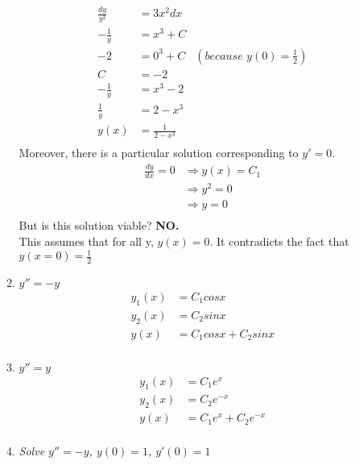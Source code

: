 \documentclass{article}
\begin{document}
\begin{enumerate}
\begin{enumerate}
                    \begin{align*}
                        \frac{dy}{y^2}&=3x^2dx \\
                        -\frac{1}{y}&=x^3+C \\
                        -2&=0^3+C &(\textit{because }y(0)=\frac{1}{2}) \\
                        C&=-2 \\
                        -\frac{1}{y}&=x^3-2 \\
                        \frac{1}{y}&=2-x^3 \\
                        y(x)&=\frac{1}{2-x^3} \\
                    \end{align*}
                    Moreover, there is a particular solution corresponding to $y'=0$.
                        \begin{align*}
                            \frac{dy}{dx}=0&\Rightarrow y(x)=C_1 \\
                            &\Rightarrow y^2=0 \\
                            &\Rightarrow y=0 \\
                        \end{align*}
                    But is this solution viable? \textbf{NO.} \\
                    This assumes that for all y, $y(x)=0$. It contradicts the fact that $y(x=0)=\frac{1}{2}$ \\
                    \item \textit{$y''=-y$}
                    \begin{align*}
                        y_1(x)&=C_1cosx \\
                        y_2(x)&=C_2sinx \\
                        y(x)&=C_1cosx+C_2sinx \\
                    \end{align*}
                    \item \textit{$y''=y$}
                    \begin{align*}
                        y_1(x)&=C_1e^x \\
                        y_2(x)&=C_2e^{-x} \\
                        y(x)&=C_1e^x+C_2e^{-x} \\
                    \end{align*}
                    \item \textit{Solve $y''=-y$, $y(0)=1$, $y'(0)=1$}

\end{enumerate}
\end{enumerate}
\end{document}

